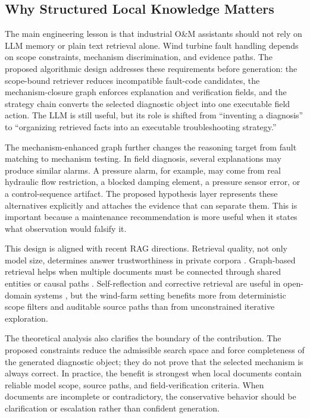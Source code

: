 \documentclass[lettersize,journal]{IEEEtran}
\begin{document}
\subsection{Why Structured Local Knowledge Matters}
The main engineering lesson is that industrial O\&M assistants should not rely on LLM memory or plain text retrieval alone. Wind turbine fault handling depends on scope constraints, mechanism discrimination, and evidence paths. The proposed algorithmic design addresses these requirements before generation: the scope-bound retriever reduces incompatible fault-code candidates, the mechanism-closure graph enforces explanation and verification fields, and the strategy chain converts the selected diagnostic object into one executable field action. The LLM is still useful, but its role is shifted from ``inventing a diagnosis'' to ``organizing retrieved facts into an executable troubleshooting strategy.''

The mechanism-enhanced graph further changes the reasoning target from fault matching to mechanism testing. In field diagnosis, several explanations may produce similar alarms. A pressure alarm, for example, may come from real hydraulic flow restriction, a blocked damping element, a pressure sensor error, or a control-sequence artifact. The proposed hypothesis layer represents these alternatives explicitly and attaches the evidence that can separate them. This is important because a maintenance recommendation is more useful when it states what observation would falsify it.

This design is aligned with recent RAG directions. Retrieval quality, not only model size, determines answer trustworthiness in private corpora \cite{es2023ragas,zhao2024ragSurvey}. Graph-based retrieval helps when multiple documents must be connected through shared entities or causal paths \cite{edge2024graphrag,peng2024graphragSurvey}. Self-reflection and corrective retrieval are useful in open-domain systems \cite{asai2023selfrag,yan2024crag}, but the wind-farm setting benefits more from deterministic scope filters and auditable source paths than from unconstrained iterative exploration.

The theoretical analysis also clarifies the boundary of the contribution. The proposed constraints reduce the admissible search space and force completeness of the generated diagnostic object; they do not prove that the selected mechanism is always correct. In practice, the benefit is strongest when local documents contain reliable model scope, source paths, and field-verification criteria. When documents are incomplete or contradictory, the conservative behavior should be clarification or escalation rather than confident generation.
\end{document}
